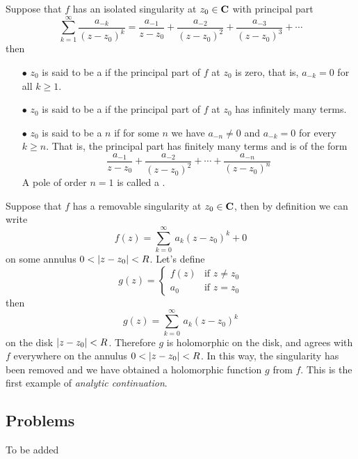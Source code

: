 \vspace*{1em}

\begin{definition}
Suppose that $f$ has an isolated singularity at $z_0 \in \mathbf C$ with principal part 
\[\sum_{k=1}^\infty \frac{a_{-k}}{(z - z_0)^k} = \frac{a_{-1}}{z - z_0} + \frac{a_{-2}}{(z - z_0)^2} + \frac{a_{-3}}{(z - z_0)^3} + \cdots\]
then
\begin{itemize}
\item[$\bullet$] $z_0$ is said to be a  if the principal part of $f$ at $z_0$ is zero, that is, $a_{-k} = 0$ for all $k \geq 1$.
\item[$\bullet$] $z_0$ is said to be a  if the principal part of $f$ at $z_0$ has infinitely many terms.
\item[$\bullet$] $z_0$ is said to be a  {\color{blue}$n$} if for some $n$ we have $a_{-n} \neq 0$ and $a_{-k} = 0$ for every $k \geq n$. That is, the principal part has finitely many terms and is of the form
\[\frac{a_{-1}}{z - z_0} + \frac{a_{-2}}{(z - z_0)^2} + \cdots + \frac{a_{-n}}{(z - z_0)^n}\]
A pole of order $n = 1$ is called a .
\end{itemize}
\end{definition}

\vspace*{1em}

\begin{remark}
Suppose that $f$ has a removable singularity at $z_0 \in \mathbf C$, then by definition we can write
\[f(z) = \sum_{k=0}^\infty\, a_k(z - z_0)^k + 0\]
on some annulus $0 < \left\lvert z - z_0\right\rvert < R$. Let's define
\[g(z) = \begin{cases} f(z) & \text{if } z \neq z_0\\[0.5em] a_0 & \text{if } z = z_0 \end{cases}\]
then
\[g(z) = \sum_{k=0}^\infty\, a_k(z - z_0)^k\]
on the disk $\left\lvert z - z_0\right\rvert < R$. Therefore $g$ is holomorphic on the disk, and agrees with $f$ everywhere on the annulus $0 < \left\lvert z - z_0\right\rvert < R$. In this way, the singularity has been removed and we have obtained a holomorphic function $g$ from $f$. This is the first example of \emph{analytic continuation}.
\end{remark}

\vspace*{2em}

\subsection{Problems}
\vspace{0.1in}
To be added
%
